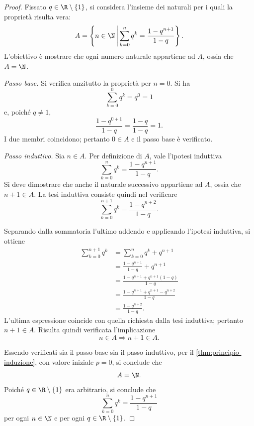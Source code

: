 \begin{proof}
Fissato \(q\in\R\setminus\{1\}\), si considera l'insieme dei naturali
per i quali la proprietà risulta vera:
\[
  A=\left\{n\in\N\,\middle|\,
    \sum_{k=0}^{n}q^k=\frac{1-q^{n+1}}{1-q}\right\}.
\]
L'obiettivo è mostrare che ogni numero naturale appartiene ad \(A\),
ossia che \(A=\N\).

\emph{Passo base.}
Si verifica anzitutto la proprietà per \(n=0\). Si ha
\[
  \sum_{k=0}^{0}q^k=q^0=1
\]
e, poiché \(q\neq1\),
\[
  \frac{1-q^{0+1}}{1-q}
  =\frac{1-q}{1-q}
  =1.
\]
I due membri coincidono; pertanto \(0\in A\) e il passo base è verificato.

\emph{Passo induttivo.}
Sia \(n\in A\). Per definizione di \(A\), vale l'ipotesi induttiva
\[
  \sum_{k=0}^{n}q^k=\frac{1-q^{n+1}}{1-q}.
\]
Si deve dimostrare che anche il naturale successivo appartiene ad \(A\),
ossia che \(n+1\in A\). La tesi induttiva consiste quindi nel verificare
\[
  \sum_{k=0}^{n+1}q^k=\frac{1-q^{n+2}}{1-q}.
\]

Separando dalla sommatoria l'ultimo addendo e applicando l'ipotesi
induttiva, si ottiene
\begin{align*}
  \sum_{k=0}^{n+1}q^k
    &=\sum_{k=0}^{n}q^k+q^{n+1}\\
    &=\frac{1-q^{n+1}}{1-q}+q^{n+1}\\
    &=\frac{1-q^{n+1}+q^{n+1}(1-q)}{1-q}\\
    &=\frac{1-q^{n+1}+q^{n+1}-q^{n+2}}{1-q}\\
    &=\frac{1-q^{n+2}}{1-q}.
\end{align*}
L'ultima espressione coincide con quella richiesta dalla tesi induttiva;
pertanto \(n+1\in A\). Risulta quindi verificata l'implicazione
\[
  n\in A\Longrightarrow n+1\in A.
\]

Essendo verificati sia il passo base sia il passo induttivo, per il
\cref{thm:principio-induzione}, con valore iniziale \(p=0\), si conclude che
\[
  A=\N.
\]
Poiché \(q\in\R\setminus\{1\}\) era arbitrario, si conclude che
\[
  \sum_{k=0}^{n}q^k=\frac{1-q^{n+1}}{1-q}
\]
per ogni \(n\in\N\) e per ogni \(q\in\R\setminus\{1\}\).
\end{proof}
